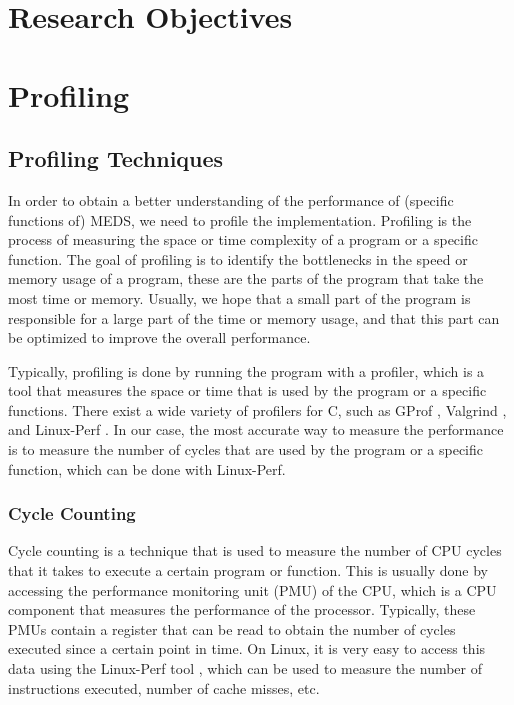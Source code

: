 \documentclass[11pt,a4paper]{report}
\begin{document}
\chapter{Research Objectives}
\label{ch:researchobjectives}

\chapter{Profiling}
\label{ch:profiling}
\section{Profiling Techniques}
In order to obtain a better understanding of the performance of (specific functions of) MEDS, we need to profile the implementation. Profiling is the process of measuring the space or time complexity of a program or a specific function. The goal of profiling is to identify the bottlenecks in the speed or memory usage of a program, these are the parts of the program that take the most time or memory. Usually, we hope that a small part of the program is responsible for a large part of the time or memory usage, and that this part can be optimized to improve the overall performance.

Typically, profiling is done by running the program with a profiler, which is a tool that measures the space or time that is used by the program or a specific functions. There exist a wide variety of profilers for C, such as GProf \cite{graham1982gprof}, Valgrind \cite{nethercote2007valgrind}, and Linux-Perf \cite{de2010new}. In our case, the most accurate way to measure the performance is to measure the number of cycles that are used by the program or a specific function, which can be done with Linux-Perf.

\subsection{Cycle Counting}
Cycle counting is a technique that is used to measure the number of CPU cycles that it takes to execute a certain program or function. This is usually done by accessing the performance monitoring unit (PMU) of the CPU, which is a CPU component that measures the performance of the processor. Typically, these PMUs contain a register that can be read to obtain the number of cycles executed since a certain point in time. On Linux, it is very easy to access this data using the Linux-Perf tool \cite{de2010new}, which can be used to measure the number of instructions executed, number of cache misses, etc.
\end{document}
